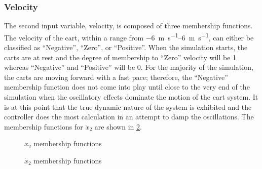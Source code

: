 \subsubsection{Velocity} The second input variable, velocity, is composed of three membership functions. The
velocity of the cart, within a range from \SIrange{-6}{6}{\metre\per\second}, can either be classified as
``Negative'', ``Zero'', or ``Positive''. When the simulation starts, the carts are at rest and the degree of
membership to ``Zero'' velocity will be 1 whereas ``Negative'' and ``Positive'' will be 0. For the majority of
the simulation, the carts are moving forward with a fast pace; therefore, the ``Negative'' membership function
does not come into play until close to the very end of the  simulation when the oscillatory effects dominate
the motion of the cart system. It is at this point that the true dynamic nature of the system is exhibited and
the controller does the most calculation in an attempt to damp the oscillations. The membership functions for
$\ddot{x}_2$ are shown in \cref{f:x4mfs}.

\begin{figure}[ht]
    \centering
    
    \caption{$x_2$ membership functions}\label{f:x2mfs}
\end{figure}

\begin{figure}[ht]
    \centering
    
    \caption{$\dot{x}_2$ membership functions}\label{f:x4mfs}
\end{figure}


